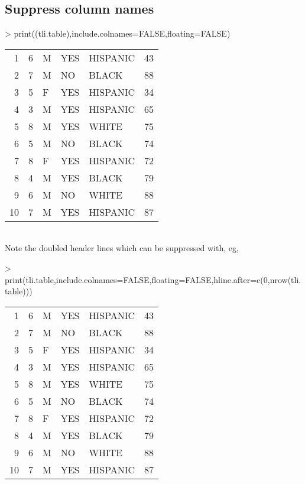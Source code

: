 \documentclass[letterpaper]{article}
\begin{document}
\subsection{Suppress column names}
\begin{Schunk}
\begin{Sinput}
> print((tli.table),include.colnames=FALSE,floating=FALSE)
\end{Sinput}
% latex table generated in R 3.1.1 by xtable 1.7-3 package
% 
\begin{tabular}{|rr|lp{3cm}l|r|}
  \hline
  \hline
1 & 6 & M & YES & HISPANIC & 43 \\ 
  2 &  7 & M & NO & BLACK & 88 \\ 
  3 &   5 & F & YES & HISPANIC &  34 \\ 
  4 &    3 & M & YES & HISPANIC &   65 \\ 
  5 &     8 & M & YES & WHITE &    75 \\ 
  6 & 5 & M & NO & BLACK & 74 \\ 
  7 &  8 & F & YES & HISPANIC & 72 \\ 
  8 &   4 & M & YES & BLACK &  79 \\ 
  9 &    6 & M & NO & WHITE &   88 \\ 
  10 &     7 & M & YES & HISPANIC &    87 \\ 
   \hline
\end{tabular}\end{Schunk}
\\
Note the doubled header lines which can be suppressed with, eg,
\begin{Schunk}
\begin{Sinput}
> print(tli.table,include.colnames=FALSE,floating=FALSE,hline.after=c(0,nrow(tli.table)))
\end{Sinput}
% latex table generated in R 3.1.1 by xtable 1.7-3 package
% 
\begin{tabular}{|rr|lp{3cm}l|r|}
   \hline
1 & 6 & M & YES & HISPANIC & 43 \\ 
  2 &  7 & M & NO & BLACK & 88 \\ 
  3 &   5 & F & YES & HISPANIC &  34 \\ 
  4 &    3 & M & YES & HISPANIC &   65 \\ 
  5 &     8 & M & YES & WHITE &    75 \\ 
  6 & 5 & M & NO & BLACK & 74 \\ 
  7 &  8 & F & YES & HISPANIC & 72 \\ 
  8 &   4 & M & YES & BLACK &  79 \\ 
  9 &    6 & M & NO & WHITE &   88 \\ 
  10 &     7 & M & YES & HISPANIC &    87 \\ 
   \hline
\end{tabular}\end{Schunk}
\end{document}

